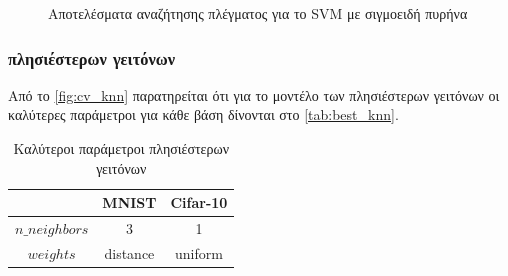 \documentclass[a4paper]{article}
\begin{document}
\begin{figure}[H]
    \caption{Αποτελέσματα αναζήτησης πλέγματος για το SVM με σιγμοειδή πυρήνα}
    \label{fig:cv_sigmoid}
\end{figure}

\subsubsection{πλησιέστερων γειτόνων}

Από το \autoref{fig:cv_knn} παρατηρείται ότι για το μοντέλο των πλησιέστερων
γειτόνων οι καλύτερες παράμετροι για κάθε βάση δίνονται στο
\autoref{tab:best_knn}.

\begin{table}[h]
\centering
\begin{tabular}{|c|c|c|}
\hline
               & MNIST    & Cifar-10 \\ \hline
$n\_neighbors$ & 3        & 1        \\ \hline
$weights$      & distance & uniform  \\ \hline
\end{tabular}
\caption{Καλύτεροι παράμετροι πλησιέστερων γειτόνων}
\label{tab:best_knn}
\end{table}
\end{document}
